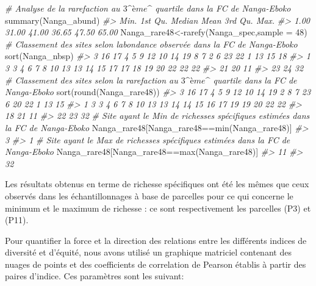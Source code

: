 \documentclass[
  12pt,
  a4paper,
  extrafontsizes,
  onecolumn,
  openright]{book}
\newenvironment{Shaded}{\begin{snugshade}}{\end{snugshade}}
\newcommand{\AttributeTok}[1]{\textcolor[rgb]{0.77,0.63,0.00}{#1}}
\newcommand{\CommentTok}[1]{\textcolor[rgb]{0.56,0.35,0.01}{\textit{#1}}}
\newcommand{\DecValTok}[1]{\textcolor[rgb]{0.00,0.00,0.81}{#1}}
\newcommand{\FunctionTok}[1]{\textcolor[rgb]{0.00,0.00,0.00}{#1}}
\newcommand{\NormalTok}[1]{#1}
\newcommand{\OtherTok}[1]{\textcolor[rgb]{0.56,0.35,0.01}{#1}}
\newcommand{\SpecialCharTok}[1]{\textcolor[rgb]{0.00,0.00,0.00}{#1}}
\theoremstyle{definition}
\theoremstyle{definition}
\theoremstyle{definition}
\theoremstyle{definition}
\theoremstyle{remark}
\begin{document}
\begin{Shaded}
\begin{Highlighting}[]
\CommentTok{\# Analyse de la rarefaction au $3\^{}ème\^{}$ quartile dans la FC de Nanga{-}Eboko}
\FunctionTok{summary}\NormalTok{(Nanga\_abund)}
\CommentTok{\#\textgreater{}    Min. 1st Qu.  Median    Mean 3rd Qu.    Max. }
\CommentTok{\#\textgreater{}    1.00   31.00   41.00   36.65   47.50   65.00}
\NormalTok{Nanga\_rare48}\OtherTok{\textless{}{-}}\FunctionTok{rarefy}\NormalTok{(Nanga\_spec,}\AttributeTok{sample =} \DecValTok{48}\NormalTok{)}
\CommentTok{\# Classement des sites selon l\textquotesingle{}abondance observée dans la FC de Nanga{-}Eboko}
\FunctionTok{sort}\NormalTok{(Nanga\_nbsp)}
\CommentTok{\#\textgreater{}  3 16 17  4  5  9 12 10 14 19  8  7  2  6 23 22  1 13 15 18 }
\CommentTok{\#\textgreater{}  1  3  3  4  6  7  8 10 13 13 14 15 17 17 18 19 20 22 22 22 }
\CommentTok{\#\textgreater{} 21 20 11 }
\CommentTok{\#\textgreater{} 23 24 32}
\CommentTok{\# Classement des sites selon la rarefaction au $3\^{}ème\^{}$ quartile dans la FC de Nanga{-}Eboko}
\FunctionTok{sort}\NormalTok{(}\FunctionTok{round}\NormalTok{(Nanga\_rare48))}
\CommentTok{\#\textgreater{}  3 16 17  4  5  9 12 10 14 19  2  8  7 23  6 20 22  1 13 15 }
\CommentTok{\#\textgreater{}  1  3  3  4  6  7  8 10 13 13 14 14 15 16 17 19 19 20 22 22 }
\CommentTok{\#\textgreater{} 18 21 11 }
\CommentTok{\#\textgreater{} 22 23 32}
\CommentTok{\# Site ayant le Min de richesses spécifiques estimées dans la FC de Nanga{-}Eboko}
\NormalTok{Nanga\_rare48[Nanga\_rare48}\SpecialCharTok{==}\FunctionTok{min}\NormalTok{(Nanga\_rare48)]}
\CommentTok{\#\textgreater{} 3 }
\CommentTok{\#\textgreater{} 1}
\CommentTok{\# Site ayant le Max de richesses spécifiques estimées dans la FC de Nanga{-}Eboko}
\NormalTok{Nanga\_rare48[Nanga\_rare48}\SpecialCharTok{==}\FunctionTok{max}\NormalTok{(Nanga\_rare48)]}
\CommentTok{\#\textgreater{} 11 }
\CommentTok{\#\textgreater{} 32}
\end{Highlighting}
\end{Shaded}

Les résultats obtenus en terme de richesse spécifiques ont été les mêmes que ceux observés dans les échantillonnages à base de parcelles pour ce qui concerne le minimum et le maximum de richesse : ce sont respectivement les parcelles (P3) et (P11).

Pour quantifier la force et la direction des relations entre les différents indices de diversité et d'équité, nous avons utilisé un graphique matriciel contenant des nuages de points et des coefficients de correlation de Pearson établis à partir des paires d'indice. Ces paramètres sont les suivant:
\end{document}
